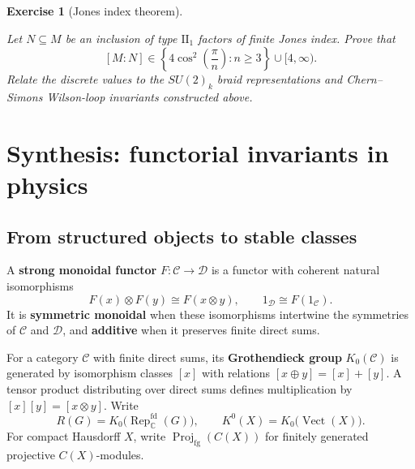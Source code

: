 \documentclass{article}
\newtheorem{exercise}{Exercise}
\begin{document}
\begin{exercise}[Jones index theorem]
\label{ex:jones-index}\leavevmode\par
\textit{Let $N\subseteq M$ be an inclusion of type $\mathrm{II}_1$ factors of finite Jones index. Prove that} \cite{jones-index}
\[
[M:N]
\in
\left\{
4\cos^2\left(\frac{\pi}{n}\right):n\geq3
\right\}
\cup
[4,\infty).
\]
\textit{Relate the discrete values to the $SU(2)_k$ braid representations
and Chern--Simons Wilson-loop invariants constructed above.}
\end{exercise}

\section{Synthesis: functorial invariants in physics}

\subsection{From structured objects to stable classes}

A \textbf{strong monoidal functor} $F:\mathcal C\to\mathcal D$ is a functor
with coherent natural isomorphisms
\[
F(x)\otimes F(y)\cong F(x\otimes y),
\qquad
1_{\mathcal D}\cong F(1_{\mathcal C}).
\]
It is \textbf{symmetric monoidal} when these isomorphisms intertwine the
symmetries of $\mathcal C$ and $\mathcal D$, and \textbf{additive} when it
preserves finite direct sums.

For a category $\mathcal C$ with finite direct sums, its
\textbf{Grothendieck group} $K_0(\mathcal C)$ is generated by isomorphism
classes $[x]$ with relations $[x\oplus y]=[x]+[y]$. A tensor product
distributing over direct sums defines multiplication by
$[x][y]=[x\otimes y]$. Write
\[
R(G)=K_0\bigl(\operatorname{Rep}_{\mathbb C}^{\mathrm{fd}}(G)\bigr),
\qquad
K^0(X)=K_0\bigl(\operatorname{Vect}(X)\bigr).
\]
For compact Hausdorff $X$, write
$\operatorname{Proj}_{\mathrm{fg}}(C(X))$ for finitely generated projective
$C(X)$-modules.
\end{document}
